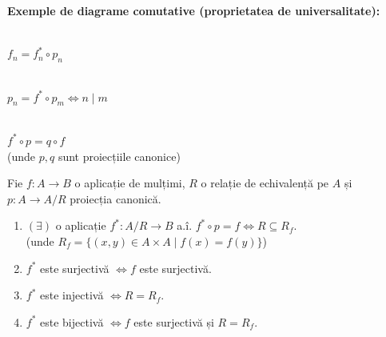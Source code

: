 \vspace{1em}
\textbf{Exemple de diagrame comutative (proprietatea de universalitate):}

\begin{center}
\begin{minipage}{0.3\textwidth}
\\[1ex] \centering $f_n = f_n^* \circ p_n$
\end{minipage}%
\begin{minipage}{0.3\textwidth}
\\[1ex] \centering $p_n = f^* \circ p_m \iff n \mid m$
\end{minipage}%
\begin{minipage}{0.3\textwidth}
\\[1ex] \centering $f^* \circ p = q \circ f$ \\
(unde $p, q$ sunt proiecțiile canonice)
\end{minipage}
\end{center}

\begin{theorem}
Fie $f: A \rightarrow B$ o aplicație de mulțimi, $R$ o relație de echivalență pe $A$ și $p: A \rightarrow A/R$ proiecția canonică.
\begin{enumerate}
    \item $(\exists)$ o aplicație $f^*: A/R \rightarrow B$ a.î. $f^* \circ p = f \iff R \subseteq R_f$. \\
    (unde $R_f = \{(x,y) \in A \times A \mid f(x) = f(y)\}$)
    \item $f^*$ este surjectivă $\iff f$ este surjectivă.
    \item $f^*$ este injectivă $\iff R = R_f$.
    \item $f^*$ este bijectivă $\iff f$ este surjectivă și $R = R_f$.
\end{enumerate}
\end{theorem}

